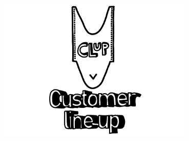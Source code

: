 \begin{titlepage}
                \vfill

                \includegraphics[width=0.7\textwidth]{Images/cluplogo.jpg}\\

                \vfill
        \end{titlepage}

